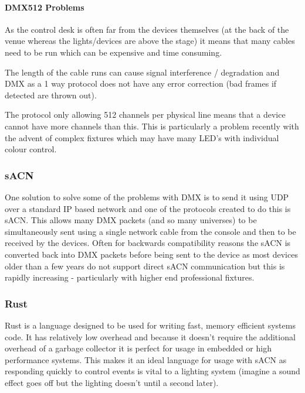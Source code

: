 \documentclass[11pt,a4paper,notitlepage]{report}
\begin{document}
	\paragraph*{DMX512 Problems}
	\begin{list}{}{}
		\item As the control desk is often far from the devices themselves (at the back of the venue whereas the lights/devices are above the stage) it means that many cables need to be run which can be expensive and time consuming.
		\item The length of the cable runs can cause signal interference / degradation and DMX as a 1 way protocol does not have any error correction (bad frames if detected are thrown out).
		\item The protocol only allowing 512 channels per physical line means that a device cannot have more channels than this. This is particularly a problem recently with the advent of complex fixtures which may have many LED's with individual colour control.
	\end{list}
	
	\subsubsection{sACN}
	One solution to solve some of the problems with DMX is to send it using UDP over a standard IP based network and one of the protocols created to do this is sACN. This allows many DMX packets (and so many universes) to be simultaneously sent using a single network cable from the console and then to be received by the devices. Often for backwards compatibility reasons the sACN is converted back into DMX packets before being sent to the device as most devices older than a few years do not support direct sACN communication but this is rapidly increasing - particularly with higher end professional fixtures. 
	
	\subsubsection{Rust}
	Rust \cite{RUST_LANG} is a language designed to be used for writing fast, memory efficient systems code. It has relatively low overhead and because it doesn't require the additional overhead of a garbage collector it is perfect for usage in embedded or high performance systems. This makes it an ideal language for usage with sACN as responding quickly to control events is vital to a lighting system (imagine a sound effect goes off but the lighting doesn't until a second later). 
	
\end{document}
